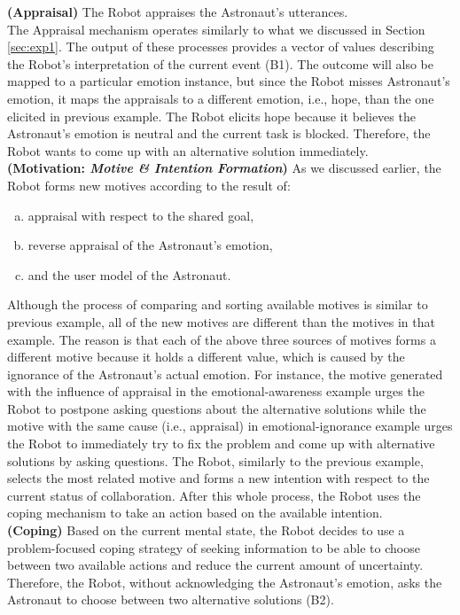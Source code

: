 \noindent\textbf{(Appraisal)} The Robot appraises the Astronaut's utterances.\\

The Appraisal mechanism operates similarly to what we discussed in Section
\ref{sec:exp1}. The output of these processes provides a vector of values
describing the Robot's interpretation of the current event (B1). The outcome
will also be mapped to a particular emotion instance, but since the Robot misses
Astronaut's emotion, it maps the appraisals to a different emotion, i.e.,
hope, than the one elicited in previous example. The Robot elicits hope because
it believes the Astronaut's emotion is neutral and the current task is blocked.
Therefore, the Robot wants to come up with an alternative solution
immediately.\\

\noindent\textbf{(Motivation: \textit{Motive \& Intention Formation})} As
we discussed earlier, the Robot forms new motives according to the result of:

\begin{enumerate}[a)]
  \item appraisal with respect to the shared goal,
  \item reverse appraisal of the Astronaut's emotion,
  \item and the user model of the Astronaut. 
\end{enumerate} 

Although the process of comparing and sorting available motives is similar to
previous example, all of the new motives are different than the motives in that
example. The reason is that each of the above three sources of motives forms a
different motive because it holds a different value, which is caused by the
ignorance of the Astronaut's actual emotion. For instance, the motive generated
with the influence of appraisal in the emotional-awareness example urges the
Robot to postpone asking questions about the alternative solutions while the
motive with the same cause (i.e., appraisal) in emotional-ignorance example
urges the Robot to immediately try to fix the problem and come up with
alternative solutions by asking questions. The Robot, similarly to the previous
example, selects the most related motive and forms a new intention with respect
to the current status of collaboration. After this whole process, the Robot uses
the coping mechanism to take an action based on the available intention.\\

\noindent\textbf{(Coping)} Based on the current mental state, the Robot decides
to use a problem-focused coping strategy of seeking information to be able to
choose between two available actions and reduce the current amount of
uncertainty. Therefore, the Robot, without acknowledging the Astronaut's
emotion, asks the Astronaut to choose between two alternative solutions (B2).\\


